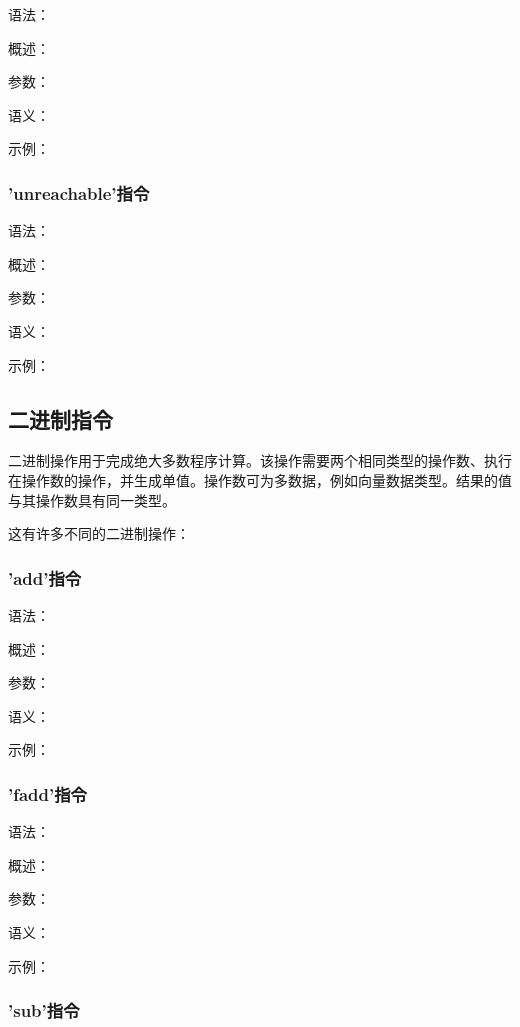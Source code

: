 \documentclass[12pt,a4paper]{article}
\begin{document}
{语法：

概述：

参数：

语义：

示例：


\subsubsection{'unreachable'指令} %

语法：

概述：

参数：

语义：

示例：


\subsection{二进制指令}

二进制操作用于完成绝大多数程序计算。该操作需要两个相同类型的操作数、执行在操作数的操作，并生成单值。操作数可为多数据，例如向量数据类型。结果的值与其操作数具有同一类型。

这有许多不同的二进制操作：

\subsubsection{'add'指令} %

语法：

概述：

参数：

语义：

示例：


\subsubsection{'fadd'指令} %

语法：

概述：

参数：

语义：

示例：


\subsubsection{'sub'指令} %

}
\end{document}
